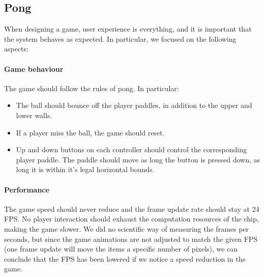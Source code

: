 \subsection{Pong}
\label{subsection:pong-testing}
When designing a game, user experience is everything, and it is important that the system behaves as expected. In particular, we focused on the following aspects:

\paragraph{Game behaviour}
The game should follow the rules of pong. In particular:
\begin{itemize}
	\item The ball should bounce off the player paddles, in addition to the upper and lower walls.
	\item If a player miss the ball, the game should reset.
	\item Up and down buttons on each controller should control the corresponding player paddle. The paddle should move as long the button is pressed down, as long it is within it's legal horizontal bounds.
\end{itemize}

\paragraph{Performance}
The game speed should never reduce and the frame update rate should stay at 24 FPS. No player interaction should exhaust the computation resources of the chip, making the game slower. We did no scientific way of measuring the frames per seconds, but since the game animations are not adjusted to match the given FPS (one frame update will move the items a specific number of pixels), we can conclude that the FPS has been lowered if we notice a speed reduction in the game.


